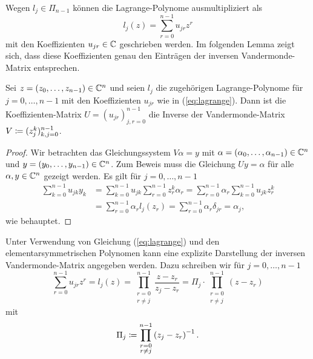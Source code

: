 \noindent Wegen $l_j \in \Pi_{n-1}$ können die Lagrange-Polynome ausmultipliziert als
\begin{equation}
    \label{eq:lagrange}
    l_j(z) = \sum_{r = 0}^{n-1} u_{jr} z^{r}
\end{equation}
mit den Koeffizienten $u_{jr} \in \mathbb{C}$ geschrieben werden.
Im folgenden Lemma zeigt sich, dass diese Koeffizienten genau den Einträgen der
inversen Vandermonde-Matrix entsprechen.
\begin{lemma}
    \label{lemma:vandermonde-inversion}
    Sei $z = (z_0, \dots, z_{n-1}) \in \mathbb{C}^n$ und seien
    $l_j$ die zugehörigen Lagrange-Polynome für $j = 0, \dots, n-1$
    mit den Koeffizienten $u_{jr}$ wie in (\ref{eq:lagrange}).
    Dann ist die Koeffizienten-Matrix $U = (u_{jr})_{j,r = 0}^{n-1}$ die
    Inverse der Vandermonde-Matrix $V \coloneqq (z_{j}^{k})_{k,j = 0}^{n-1}$.
\end{lemma}
\begin{proof}
    Wir betrachten das Gleichungssystem $V \alpha = y$ mit
    $\alpha = (\alpha_0, \dots, \alpha_{n-1}) \in \mathbb{C}^n$
    und $y = (y_0, \dots, y_{n-1}) \in \mathbb{C}^n$.
    Zum Beweis muss die Gleichung $U y = \alpha$ für alle $\alpha,  y \in \mathbb{C}^n$
    gezeigt werden.
    Es gilt für $j = 0, \dots, n-1$
    \[
        \begin{split}
            \sum_{k=0}^{n-1} u_{jk} y_k &= \sum_{k=0}^{n-1} u_{jk} \sum_{r=0}^{n-1} z_r^k \alpha_r = \sum_{r=0}^{n-1} \alpha_r \sum_{k=0}^{n-1} u_{jk} z_r^k\\
                                        &= \sum_{r=0}^{n-1} \alpha_r l_j(z_r) = \sum_{r=0}^{n-1} \alpha_r \delta_{jr} = \alpha_j,
        \end{split}
    \]
    wie behauptet.
\end{proof}

\noindent Unter Verwendung von Gleichung (\ref{eq:lagrange}) und den
elementarsymmetrischen Polynomen kann eine explizite Darstellung der
inversen Vandermonde-Matrix angegeben werden.
Dazu schreiben wir für $j = 0, \dots, n-1$
\begin{equation*}
    \sum_{r = 0}^{n-1} u_{jr} z^{r}
    = l_j(z)
    = \prod_{\substack{r=0\\ r \neq j}}^{n-1} \frac{z - z_r}{z_j - z_r}
    = \Pi_j \cdot \prod_{\substack{r=0\\ r \neq j}}^{n-1} \left( z - z_r \right)
\end{equation*}
mit
\begin{equation}
    \label{def:pi_j}
    \Pi_j \coloneqq \prod_{\substack{r=0\\ r \neq j}}^{n-1} \left( z_j - z_r \right)^{-1}.
\end{equation}


